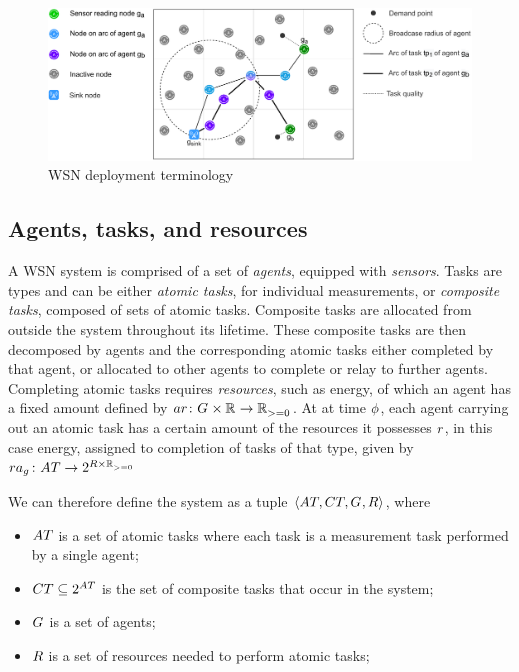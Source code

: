\newcommand{\formalAgentResources}[2]{
	\functionFormal{ar}
	{\setAgents{}{} \times \setRealNumbers{}{}}
	{\setRealNumbersNonNegative{}{}}
}


\begin{figure}
\centering 
\includegraphics[width=0.9\linewidth]{grid_concept}
\caption[WSN deployment terminology]{WSN deployment terminology}
\label{fig:gridconcept}
\end{figure}

\subsection{Agents, tasks, and resources}

A WSN system is comprised of a set of \textit{agents}, equipped with \textit{sensors}. Tasks are types and can be either \textit{atomic tasks}, for individual measurements, or \textit{composite tasks}, composed of sets of atomic tasks. Composite tasks are allocated from outside the system throughout its lifetime. These composite tasks are then decomposed by agents and the corresponding atomic tasks either completed by that agent, or allocated to other agents to complete or relay to further agents. Completing atomic tasks requires \textit{resources}, such as energy, of which an agent has a fixed amount defined by $\formalAgentResources{}{}$. At at time $\phi$, each agent carrying out an atomic task has a certain amount of the resources it possesses $\varResource{}{}$, in this case energy, assigned to completion of tasks of that type, given by $\formalTaskResourceAllocation{}{}$

We can therefore define the system as a tuple $\langle \setAtomicTask{}{}, \setCompositeTask{}{},  \setAgents{}{}, \setResource{}{} \rangle$, where
\begin{itemize}
 \item $\setAtomicTask{}{}$ is a set of atomic tasks where each task is a measurement task performed by a single agent;
 \item $\setCompositeTask{}{} \subseteq \powerSetSymbol{\setAtomicTask{}{}}{}{}$ is the set of composite tasks that occur in the system;
 \item $G_{}^{}$ is a set of agents;
 \item $\setResource{}{}$ is a set of resources needed to perform atomic tasks;
\end{itemize}

